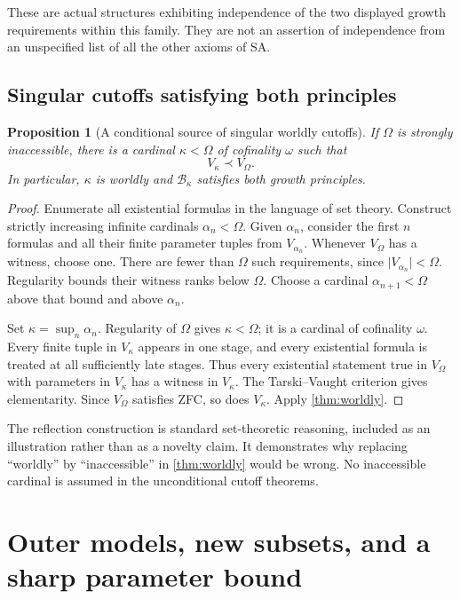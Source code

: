 \documentclass[11pt,letterpaper]{article}
\newtheorem{proposition}[theorem]{Proposition}
\theoremstyle{definition}
\theoremstyle{remark}
\newcommand{\B}{\mathcal B}
\newcommand{\card}[1]{\lvert#1\rvert}
\begin{document}
These are actual structures exhibiting independence of the two displayed
growth requirements within this family. They are not an assertion of
independence from an unspecified list of all the other axioms of SA.

\subsection{Singular cutoffs satisfying both principles}

\begin{proposition}[A conditional source of singular worldly cutoffs]
\label{prop:singular-worldly}
If $\Omega$ is strongly inaccessible, there is a cardinal $\kappa<\Omega$
of cofinality $\omega$ such that
\[
 V_\kappa\prec V_\Omega.
\]
In particular, $\kappa$ is worldly and $\B_\kappa$ satisfies both growth
principles.
\end{proposition}
\begin{proof}
Enumerate all existential formulas in the language of set theory. Construct
strictly increasing infinite cardinals $\alpha_n<\Omega$. Given
$\alpha_n$, consider the first $n$ formulas and all their finite parameter
tuples from $V_{\alpha_n}$. Whenever $V_\Omega$ has a witness, choose one.
There are fewer than $\Omega$ such requirements, since
$\card{V_{\alpha_n}}<\Omega$. Regularity bounds their witness ranks below
$\Omega$. Choose a cardinal $\alpha_{n+1}<\Omega$ above that bound and above
$\alpha_n$.

Set $\kappa=\sup_n\alpha_n$. Regularity of $\Omega$ gives $\kappa<\Omega$;
it is a cardinal of cofinality $\omega$. Every finite tuple in $V_\kappa$
appears in one stage, and every existential formula is treated at all
sufficiently late stages. Thus every existential statement true in
$V_\Omega$ with parameters in $V_\kappa$ has a witness in $V_\kappa$.
The Tarski--Vaught criterion gives elementarity. Since $V_\Omega$ satisfies
ZFC, so does $V_\kappa$. Apply \cref{thm:worldly}.
\end{proof}

The reflection construction is standard set-theoretic reasoning, included
as an illustration rather than as a novelty claim. It demonstrates why
replacing ``worldly'' by ``inaccessible'' in \cref{thm:worldly} would be wrong.
No inaccessible cardinal is assumed in the unconditional cutoff theorems.

\section{Outer models, new subsets, and a sharp parameter bound}
\label{sec:extensions}
\end{document}
